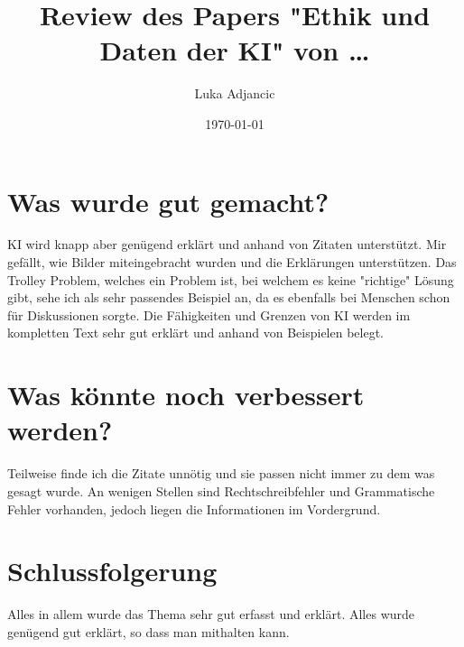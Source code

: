 \documentclass{article}
\title{Review des Papers "Ethik und Daten der KI" von \dots}
\author{Luka Adjancic}
\date{\today}
\begin{document}
\maketitle

\section{Was wurde gut gemacht?}
    KI wird knapp aber genügend erklärt und anhand von Zitaten unterstützt. Mir gefällt, wie Bilder miteingebracht wurden und die Erklärungen unterstützen. Das Trolley Problem, welches ein Problem ist, bei welchem es keine "richtige" Lösung gibt, sehe ich als sehr passendes Beispiel an, da es ebenfalls bei Menschen schon für Diskussionen sorgte. Die Fähigkeiten und Grenzen von KI werden im kompletten Text sehr gut erklärt und anhand von Beispielen belegt.

\section{Was könnte noch verbessert werden?}

Teilweise finde ich die Zitate unnötig und sie passen nicht immer zu dem was gesagt wurde. An wenigen Stellen sind Rechtschreibfehler und Grammatische Fehler vorhanden, jedoch liegen die Informationen im Vordergrund.

\section{Schlussfolgerung}
Alles in allem wurde das Thema sehr gut erfasst und erklärt. Alles wurde genügend gut erklärt, so dass man mithalten kann. 

\printbibliography
\end{document}
